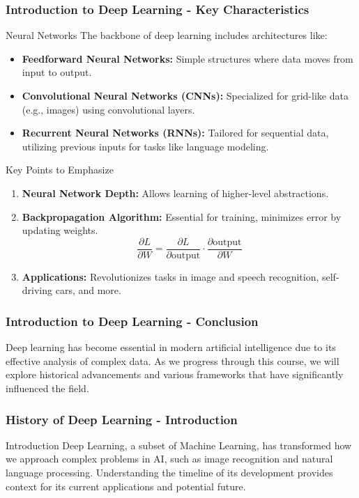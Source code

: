 \documentclass[aspectratio=169]{beamer}
\begin{document}
\begin{frame}[fragile]
    \frametitle{Introduction to Deep Learning - Key Characteristics}
    \begin{block}{Neural Networks}
        The backbone of deep learning includes architectures like:
        \begin{itemize}
            \item \textbf{Feedforward Neural Networks:} Simple structures where data moves from input to output.
            \item \textbf{Convolutional Neural Networks (CNNs):} Specialized for grid-like data (e.g., images) using convolutional layers.
            \item \textbf{Recurrent Neural Networks (RNNs):} Tailored for sequential data, utilizing previous inputs for tasks like language modeling.
        \end{itemize}
    \end{block}
    
    \begin{block}{Key Points to Emphasize}
        \begin{enumerate}
            \item \textbf{Neural Network Depth:} Allows learning of higher-level abstractions.
            \item \textbf{Backpropagation Algorithm:} Essential for training, minimizes error by updating weights.
            \begin{equation}
                \frac{\partial L}{\partial W} = \frac{\partial L}{\partial \text{output}} \cdot \frac{\partial \text{output}}{\partial W}
            \end{equation}
            \item \textbf{Applications:} Revolutionizes tasks in image and speech recognition, self-driving cars, and more.
        \end{enumerate}
    \end{block}
\end{frame}

\begin{frame}[fragile]
    \frametitle{Introduction to Deep Learning - Conclusion}
    Deep learning has become essential in modern artificial intelligence due to its effective analysis of complex data. As we progress through this course, we will explore historical advancements and various frameworks that have significantly influenced the field.
\end{frame}

\begin{frame}[fragile]
    \frametitle{History of Deep Learning - Introduction}
    \begin{block}{Introduction}
        Deep Learning, a subset of Machine Learning, has transformed how we approach complex problems in AI, such as image recognition and natural language processing. Understanding the timeline of its development provides context for its current applications and potential future.
    \end{block}
\end{frame}
\end{document}
